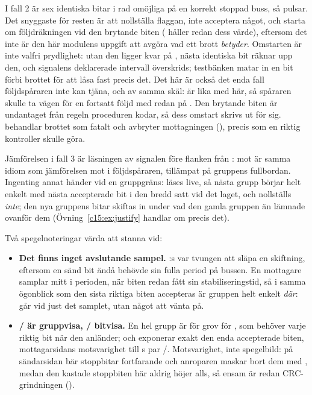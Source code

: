 I fall 2 är sex identiska bitar i rad omöjliga på en korrekt stoppad buss, så 
pulsar. Det snyggaste för resten är att nollställa flaggan, inte acceptera något, och starta om
följdräkningen vid den brytande biten ( håller redan dess värde), eftersom det inte är
den här modulens uppgift att avgöra vad ett brott \emph{betyder}. Omstarten är inte valfri
prydlighet: utan den ligger  kvar på , nästa identiska bit räknar upp
den, och signalens deklarerade intervall överskrids; testbänken matar in en bit förbi brottet för att
låsa fast precis det. Det här är också det enda fall följdspåraren inte kan tjäna, och av samma skäl:
 är lika med  här, så spåraren skulle ta vägen för en fortsatt följd med
 redan på . Den brytande biten är undantaget från regeln proceduren
kodar, så dess omstart skrivs ut för sig.  behandlar brottet som fatalt och
avbryter mottagningen (), precis som en riktig kontroller skulle göra.

Jämförelsen i fall 3 är läsningen av signalen före flanken från : 
mot  är samma idiom som jämförelsen mot  i följdspåraren,
tillämpat på gruppens fullbordan. Ingenting annat händer vid en gruppgräns:
 läses live, så nästa grupp börjar helt enkelt med nästa accepterade bit i den bredd
 satt vid det laget, och  nollställs \emph{inte}; den nya
gruppens bitar skiftas in under vad den gamla gruppen än lämnade ovanför dem
(Övning~\ref{c15:ex:justify} handlar om precis det).

Två spegelnoteringar värda att stanna vid:
\begin{itemize}
  \item \textbf{Det finns inget avslutande sampel.} :s  var tvungen att
    släpa en skiftning, eftersom en sänd bit ändå behövde sin fulla period på bussen. En mottagare
    samplar mitt i perioden, när biten redan fått sin stabiliseringstid, så i samma ögonblick som den
    sista riktiga biten accepteras är gruppen helt enkelt \emph{där}:  går vid just det
    samplet, utan något att vänta på.
  \item \textbf{/ är gruppvisa, /
    bitvisa.} En hel grupp är för grov för , som behöver varje riktig bit när den
    anländer;  och  exponerar exakt den enda accepterade biten,
    mottagarsidans motsvarighet till s par /.
    Motsvarighet, inte spegelbild: på sändarsidan bär stoppbitar fortfarande 
    och anroparen maskar bort dem med , medan den kastade stoppbiten här aldrig höjer
     alls, så  ensam är redan CRC-grindningen
    ().
\end{itemize}

